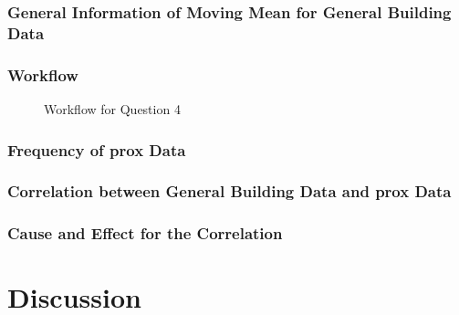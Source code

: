 \documentclass[aps, 10pt, a4paper]{article}
\begin{document}
            \subsubsection{General Information of Moving Mean for General Building Data}
            
            \subsubsection{Workflow}
                \begin{figure}[htbp]
                    \centering
                    \begin{tikzpicture}[node distance = 2cm, auto]
                    \end{tikzpicture}
                    \caption{Workflow for Question 4}
                    \label{fig:workflow4}
                \end{figure}
            
            \subsubsection{Frequency of prox Data}
            
            \subsubsection{Correlation between General Building Data and prox Data}
            
            \subsubsection{Cause and Effect for the Correlation}
    
    \section{Discussion}
    
    
    
\end{document}
